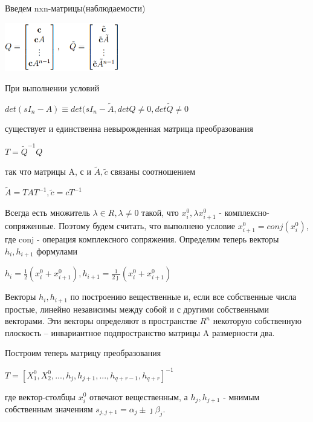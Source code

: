 \documentclass[12pt,a4paper,oneside]{article}
\begin{document}
Введем nxn-матрицы(наблюдаемости)
\begin{center}
\includegraphics[width=5cm]{Drawable/6}
\end{center}
При выполнении условий
\begin{center}
$det(sI_n-A)\equiv det(sI_n-\widetilde{A}, detQ\neq 0, det\widetilde{Q}\neq0$
\end{center}
существует и единственна невырожденная матрица преобразования
\begin{center}
	$T=\widetilde{Q}^{-1}Q$
\end{center}
так что матрицы A, с и $\widetilde{A}, \widetilde{c}$ связаны соотношением
\begin{center}
 $\widetilde{A}=TAT^{-1}, \widetilde{c}=cT^{-1}$
\end{center}

Всегда есть множитель $\lambda\in R, \lambda\neq0$ такой, что $x^0_i, \lambda x^0_{i+1}$ - комплексно-сопряженные. Поэтому будем считать, что выполнено условие $x^0_{i+1}=conj(x^0_i)$, где conj - операция комплексного сопряжения. Определим теперь векторы $h_i, h_{i+1}$ формулами
\begin{center}
$h_i=\frac{1}{2}(x^0_i+x^0_{i+1}), h_{i+1}=\frac{1}{2\jmath}(x^0_i+x^0_{i+1})$
\end{center}
Векторы $h_i, h_{i+1}$ по построению вещественные и, если все собственные числа простые, линейно независимы между собой и с другими собственными векторами. Эти векторы определяют в пространстве $R^n$ некоторую собственную плоскость – инвариантное подпространство матрицы A размерности два.

Построим теперь матрицу преобразования
\begin{center}
$T=[X^0_1, X^0_2, ..., h_j, h_{j+1}, ..., h_{q+r-1}, h_{q+r}]^{-1}$
\end{center}
где вектор-столбцы $x^0_i$ отвечают вещественным, а $h_j, h_{j+1}$ - мнимым собственным значениям $s_{j,j+1}=\alpha_j\pm\jmath\beta_j$.
\end{document}
